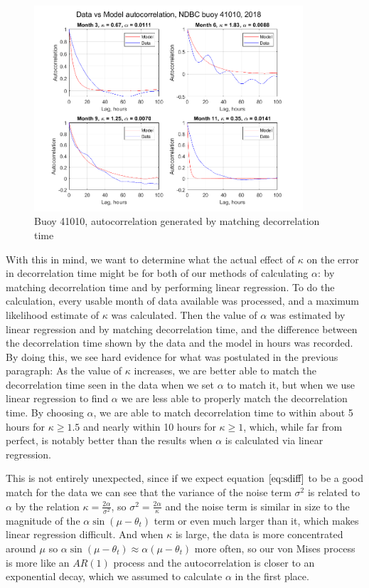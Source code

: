 \documentclass[12pt]{article}
\numberwithin{equation}{section}
\numberwithin{figure}{section}
\begin{document}
\begin{figure}[h]
\centering
\includegraphics[width=100mm]{New Folder/data v model ac 41010 2018 match decorr.png}
\caption{Buoy 41010, autocorrelation generated by matching decorrelation time}\label{fig:linreg ac}
\end{figure}

With this in mind, we want to determine what the actual effect of $\kappa$ on the error in decorrelation time might be for both of our methods of calculating $\alpha$: by matching decorrelation time and by performing linear regression. To do the calculation, every usable month of data available was processed, and a maximum likelihood estimate of $\kappa$ was calculated. Then the value of $\alpha$ was estimated by linear regression and by matching decorrelation time, and the difference between the decorrelation time shown by the data and the model in hours was recorded. By doing this, we see hard evidence for what was postulated in the previous paragraph: As the value of $\kappa$ increases, we are better able to match the decorrelation time seen in the data when we set $\alpha$ to match it, but when we use linear regression to find $\alpha$ we are less able to properly match the decorrelation time. By choosing $\alpha$, we are able to match decorrelation time to within about 5 hours for $\kappa \ge 1.5$ and nearly within 10 hours for $\kappa \ge 1$, which, while far from perfect, is notably better than the results when $\alpha$ is calculated via linear regression.

This is not entirely unexpected, since if we expect equation $\ref{eq:sdiff}$ to be a good match for the data we can see that the variance of the noise term $\sigma^2$ is related to $\alpha$ by the relation $\kappa =\frac{2\alpha}{\sigma^2}$, so $\sigma^2 = \frac{2\alpha}{\kappa}$ and the noise term is similar in size to the magnitude of the $\alpha \sin(\mu-\theta_t)$ term or even much larger than it, which makes linear regression difficult. And when $\kappa$ is large, the data is more concentrated around $\mu$ so $\alpha \sin(\mu-\theta_t) \approx \alpha (\mu-\theta_t)$ more often, so our von Mises process is more like an $AR(1)$ process and the autocorrelation is closer to an exponential decay, which we assumed to calculate $\alpha$ in the first place.
\end{document}
